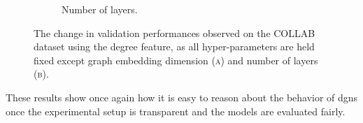 \begin{figure}[h!]
\begin{subfigure}[b]{0.49\textwidth}
        \caption{Number of layers.}
        \label{fig:collab-degree-emb}
    \end{subfigure}
    \caption{The change in validation performances observed on the COLLAB dataset using the degree feature, as all hyper-parameters are held fixed except graph embedding dimension \textsc{(a)} and number of layers \textsc{(b)}.}
       \label{fig:collab-degree-posthoc}
\end{figure}

These results show once again how it is easy to reason about the behavior of \glspl{dgn} once the experimental setup is transparent and the models are evaluated fairly.